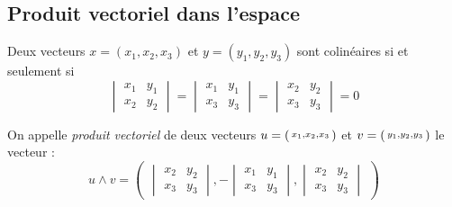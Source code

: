 \subsection{Produit vectoriel dans l'espace}

\begin{proposition}
	Deux vecteurs $x =(x_1,x_2,x_3)$ et $y=(y_1,y_2,y_3)$ sont colinéaires si et seulement si
	\[
		\begin{vmatrix}
			x_1 & y_1 \\
			x_2 & y_2
		\end{vmatrix}= \begin{vmatrix}
			x_1 & y_1\\
			x_3 & y_3
		\end{vmatrix}=  \begin{vmatrix}
			x_2 & y_2\\
			x_3 & y_3
		\end{vmatrix} = 0
	\]
\end{proposition}

\begin{definition}
	On appelle \emph{produit vectoriel} de deux vecteurs $u=\begin{psmallmatrix}x_1,x_2,x_3\end{psmallmatrix} $ et $v=\begin{psmallmatrix}y_1,y_2,y_3\end{psmallmatrix} $ le vecteur :
	\[
		u \wedge v = \begin{pmatrix}
		\begin{vmatrix}
			x_2 & y_2\\
			x_3 & y_3
		\end{vmatrix}	,
		-\begin{vmatrix}
			x_1 & y_1\\
			x_3 & y_3
		\end{vmatrix},
			\begin{vmatrix}
			x_2 & y_2\\
			x_3 & y_3
		\end{vmatrix}
		\end{pmatrix}
	\]
\end{definition}

